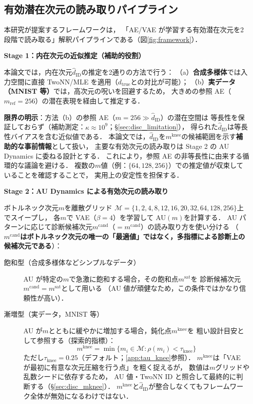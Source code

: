 \documentclass[11pt,a4paper]{jsarticle}
\newcommand{\dzopt}{m^{\mathrm{cand}}}
\newcommand{\dtrue}{d_{\mathrm{true}}}
\newcommand{\kap}{\kappa}
\newcommand{\dzsat}{m^{\mathrm{sat}}}
\newcommand{\mknee}{m^{\mathrm{knee}}}
\begin{document}
\subsection{有効潜在次元の読み取りパイプライン}\label{sec:framework_pipeline}

本研究が提案するフレームワークは，
「AE/VAE が学習する有効潜在次元を2段階で読み取る」解釈パイプラインである（図\ref{fig:framework}）．

\textbf{Stage 1：内在次元の近似推定（補助的役割）}

本論文では，内在次元$\hat{d}_\mathrm{ID}$の推定を2通りの方法で行う：
（a）\textbf{合成多様体}では入力空間に直接 TwoNN/MLE を適用（$\dtrue$との対比が可能）；
（b）\textbf{実データ（MNIST 等）}では，高次元の呪いを回避するため，
大きめの参照 AE（$m_{\mathrm{ref}} = 256$）の潜在表現を経由して推定する．

\textbf{限界の明示}：方法（b）の参照 AE（$m = 256 \gg \hat{d}_\mathrm{ID}$）の潜在空間は
等長性を保証しておらず（補助測定：$\kap \approx 10^9$；§\ref{sec:disc_limitation}），
得られた$\hat{d}_\mathrm{ID}$は等長性バイアスを含む近似値である．
本論文では，$\hat{d}_\mathrm{ID}$を$\mknee$の候補範囲を示す\textbf{補助的な事前情報}として扱い，
主要な有効次元の読み取りは Stage 2 の AU Dynamics に委ねる設計とする．
これにより，参照 AE の非等長性に由来する循環的な議論を避ける．
複数の$m$値（例：$\{64, 128, 256\}$）での推定値が収束していることを確認することで，
実用上の安定性を担保する．

\textbf{Stage 2：AU Dynamics による有効次元の読み取り}

ボトルネック次元$m$を離散グリッド
$\mathcal{M} = \{1, 2, 4, 8, 12, 16, 20, 32, 64, 128, 256\}$上でスイープし，
各$m$で VAE（$\beta = 4$）を学習して AU$(m)$を計算する．
AU パターンに応じて診断候補次元$\dzopt$（$= m^{\mathrm{cand}}$）の読み取り方を使い分ける
（\textbf{$\dzopt$はボトルネック次元の唯一の「最適値」ではなく，多指標による診断上の候補次元である}）：

\begin{description}
  \item[飽和型（合成多様体などシンプルなデータ）]
        AU が特定の$m$で急激に飽和する場合，その飽和点$\dzsat$を
        診断候補次元$\dzopt = \dzsat$として用いる
        （AU 値が頑健なため，この条件ではかなり信頼性が高い）．
  \item[漸増型（実データ，MNIST 等）]
        AU が$m$とともに緩やかに増加する場合，鈍化点$\mknee$を
        粗い設計目安として参照する（探索的指標）：
        \begin{equation}
          \mknee = \min\{m_i \in \mathcal{M} : \rho(m_i) < \tau_{\mathrm{knee}}\}
          \label{eq:mknee}
        \end{equation}
        ただし$\tau_{\mathrm{knee}} = 0.25$（デフォルト；\ref{app:tau_knee}参照）．
        $\mknee$は「VAE が最初に有意な次元圧縮を行う点」を粗く捉えるが，
        数値は$m$グリッドや乱数シードに依存するため，
        AU 値・TwoNN ID と照合して最終的に判断する（§\ref{sec:disc_mknee}）．
        $\mknee$と$\hat{d}_\mathrm{ID}$が整合しなくてもフレームワーク全体が無効になるわけではない．
\end{description}
\end{document}

